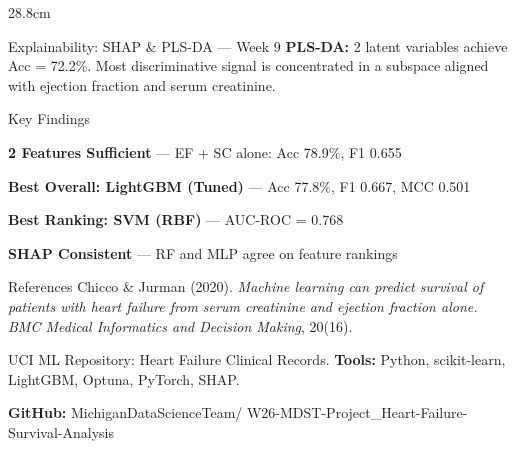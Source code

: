 \documentclass[final]{beamer}
\begin{document}
\begin{frame}[t]{}
\begin{columns}[t, totalwidth=119.2cm]
\begin{column}{28.8cm}
\begin{block}{Explainability: SHAP \& PLS-DA — Week 9}
  \medskip
  \textbf{PLS-DA:} 2 latent variables achieve Acc = 72.2\%.
  Most discriminative signal is concentrated in a subspace
  aligned with ejection fraction and serum creatinine.
\end{block}

\begin{block}{Key Findings}
  \begin{tcolorbox}[findcard=Green]
    \textbf{\color{Green}2 Features Sufficient} —
    EF + SC alone: Acc 78.9\%, F1 0.655
  \end{tcolorbox}
  \vspace{4pt}
  \begin{tcolorbox}[findcard=Blue]
    \textbf{\color{Blue}Best Overall: LightGBM (Tuned)} —
    Acc 77.8\%, F1 0.667, MCC 0.501
  \end{tcolorbox}
  \vspace{4pt}
  \begin{tcolorbox}[findcard=Amber]
    \textbf{\color{Amber}Best Ranking: SVM (RBF)} —
    AUC-ROC = 0.768
  \end{tcolorbox}
  \vspace{4pt}
  \begin{tcolorbox}[findcard=Navy]
    \textbf{\color{Navy}SHAP Consistent} —
    RF and MLP agree on feature rankings
  \end{tcolorbox}
\end{block}

\begin{block}{References}
  Chicco \& Jurman (2020). \textit{Machine learning can predict
  survival of patients with heart failure from serum creatinine
  and ejection fraction alone.}
  \textit{BMC Medical Informatics and Decision Making}, 20(16).

  \medskip
  UCI ML Repository: Heart Failure Clinical Records.
  \textbf{Tools:} Python, scikit-learn, LightGBM, Optuna,
  PyTorch, SHAP.

  \medskip
  \textbf{GitHub:} MichiganDataScienceTeam/
  W26-MDST-Project\_Heart-Failure-Survival-Analysis
\end{block}

\end{column}
\end{columns}

\end{frame}
\end{document}
